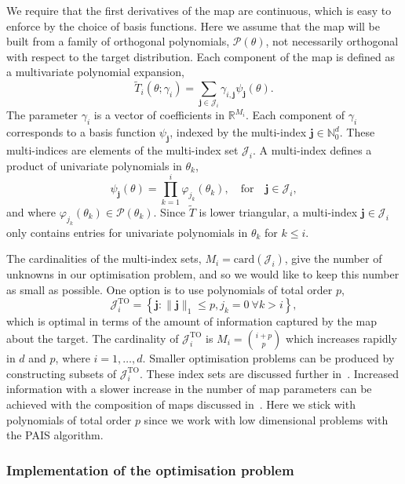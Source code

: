 \documentclass[final]{siamltex}
\begin{document}
We require that the first derivatives of the map are continuous, which is easy to enforce by the choice of basis functions. Here we assume that the map will be built from a family of orthogonal polynomials, $\mathcal{P}(\theta)$, not necessarily orthogonal with respect to the target distribution. Each component of the map is defined as a multivariate polynomial expansion,
\begin{equation}\label{eq:map_defn}
	\tilde{T}_i(\theta; \gamma_i) = \sum\limits_{\mathbf{j}\in\mathcal{J}_i} \!
\gamma_{i,\mathbf{j}}\psi_\mathbf{j}(\theta).
\end{equation}
The parameter $\gamma_i$ is a vector of coefficients in $\mathbb{R}^{M_i}$. Each component of $\gamma_i$ corresponds to a basis function
$\psi_\mathbf{j}$, indexed by the multi-index $\mathbf{j} \in \mathbb{N}_0^d$. These multi-indices are elements of the multi-index set $\mathcal{J}_i$. A multi-index defines a product of univariate polynomials in $\theta_k$,
\[
	\psi_\mathbf{j}(\theta) = \prod\limits_{k=1}^i \! \varphi_{j_k}(\theta_k), \quad \text{for} \quad \mathbf{j} \in \mathcal{J}_i,
\]
and where $\varphi_{j_k}(\theta_k) \in \mathcal{P}(\theta_k)$. Since $\tilde{T}$ is lower triangular, a multi-index $\mathbf{j}\in\mathcal{J}_i$ only contains entries for univariate polynomials in $\theta_k$ for $k\leq i$.

The cardinalities of the multi-index sets, $M_i = \text{card}(\mathcal{J}_i)$, give the number of unknowns in our
optimisation problem, and so we would like to keep this number as small as possible. One option is
to use polynomials of total order $p$,
\[
	\mathcal{J}_i^\text{TO} = \left\{\mathbf{j}:\|\mathbf{j}\|_1 \leq p, j_k = 0\ \forall k > i\right\},
\]
which is optimal in terms of the amount of information captured by the map about the target. The cardinality of $\mathcal{J}_i^\text{TO}$ is $M_i = {i+p \choose p}$ which increases rapidly in $d$ and $p$, where $i = 1, \dots, d$. Smaller optimisation problems can be produced by constructing subsets of $\mathcal{J}_i^\text{TO}$. These index sets are discussed further
in~\cite{parno2014transport}. Increased information with a slower increase in the number of map parameters can be achieved with the composition of maps discussed in~\cite{parno2015transport}. Here we stick with polynomials of total order $p$ since we work with low dimensional problems with the PAIS algorithm.


\subsubsection{Implementation of the optimisation problem}\label{sec:transport_implementation}
\end{document}
